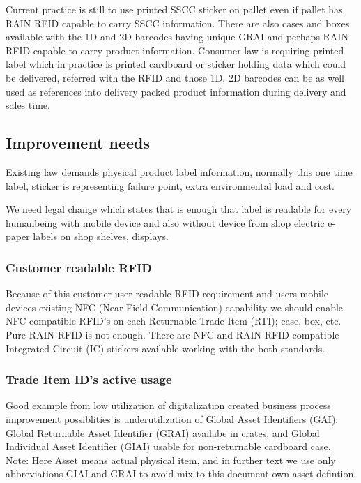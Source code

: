 Current practice is still to use printed SSCC sticker on pallet even if pallet
has RAIN RFID capable to carry SSCC information. There are also cases and boxes
available with the 1D and 2D barcodes having unique GRAI and perhaps RAIN RFID
capable to carry product information. Consumer law is requiring printed label
which in practice is printed cardboard or sticker holding data which could be
delivered, referred with the RFID and those 1D, 2D barcodes can be as well used
as references into delivery packed product information during delivery and
sales time.

\subsection{Improvement needs}
\label{improvement_needs}

Existing law demands physical product label information, normally this one time
label, sticker is representing failure point, extra environmental load and cost.

We need legal change which states that is enough that label is readable for
every humanbeing with mobile device and also without device from shop electric
e-paper labels on shop shelves, displays.

\subsubsection{Customer readable RFID}
\label{improvement_NFC_RFID}

Because of this customer user readable RFID requirement and users mobile
devices existing NFC (Near Field Communication) capability we should enable NFC
compatible RFID's on each Returnable Trade Item (RTI); case, box, etc. Pure
RAIN RFID is not enough. There are NFC and RAIN RFID compatible Integrated
Circuit (IC)\cite{RAINFC} stickers available\cite{RAINFC_label} working with
the both standards.

\subsubsection{Trade Item ID's active usage}
\label{improvement_1D_2D_RFID_usage}

Good example from low utilization of digitalization created business process
improvement possiblities is underutilization of Global Asset Identifiers (GAI):
Global Returnable Asset Identifier (GRAI)
\cite{GRAI}\cite{IFCO}\cite{EUROPOOL}
availabe in crates, and Global Individual Asset Identifier (GIAI)
\cite{GIAI}\cite{CajoMakeBright} usable for non-returnable cardboard case.
Note: Here Asset means actual physical item, and in further text we use only
abbreviations GIAI and GRAI to avoid mix to this document own asset defintion.

